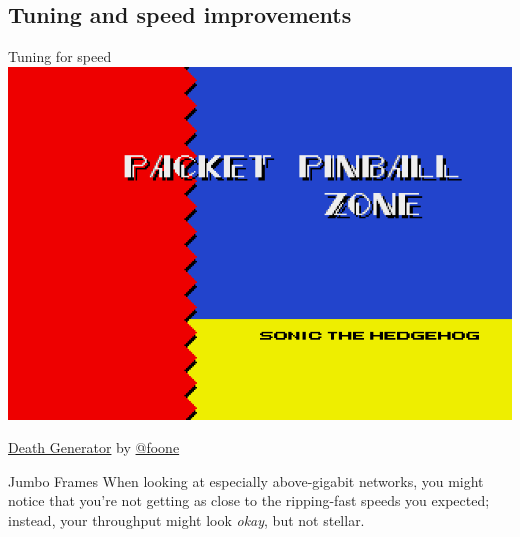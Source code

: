 \documentclass[bigger]{beamer}
\begin{document}
\subsection{Tuning and speed improvements}
\label{sec:orgb9c111a}
\begin{frame}{Tuning for speed}
    \centering
    \includegraphics[height=0.75\textheight]{./assets/packet-pinball.png}
    
    \raggedleft
    \small
    \href{http://deathgenerator.com}{Death Generator} by \href{https://twitter.com/foone}{@foone}
\end{frame}

\begin{frame}[label={sec:org13ce3d4}]{Jumbo Frames}
  When looking at especially above-gigabit networks, you might notice that you're not getting as close to the
  ripping-fast speeds you expected; instead, your throughput might look \textit{okay}, but not stellar.
\end{frame}
\end{document}
